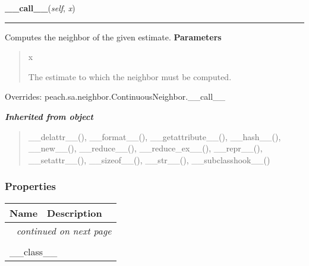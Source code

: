     \vspace{0.5ex}

\hspace{.8\funcindent}\begin{boxedminipage}{\funcwidth}

    \raggedright \textbf{\_\_call\_\_}(\textit{self}, \textit{x})

    \vspace{-1.5ex}

    \rule{\textwidth}{0.5\fboxrule}
\setlength{\parskip}{2ex}

Computes the neighbor of the given estimate.
\setlength{\parskip}{1ex}
      \textbf{Parameters}
      \vspace{-1ex}

      \begin{quote}
        \begin{Ventry}{x}

          \item[x]


The estimate to which the neighbor must be computed.
        \end{Ventry}

      \end{quote}

      Overrides: peach.sa.neighbor.ContinuousNeighbor.\_\_call\_\_

    \end{boxedminipage}


\large{\textbf{\textit{Inherited from object}}}

\begin{quote}
\_\_delattr\_\_(), \_\_format\_\_(), \_\_getattribute\_\_(), \_\_hash\_\_(), \_\_new\_\_(), \_\_reduce\_\_(), \_\_reduce\_ex\_\_(), \_\_repr\_\_(), \_\_setattr\_\_(), \_\_sizeof\_\_(), \_\_str\_\_(), \_\_subclasshook\_\_()
\end{quote}


  \subsubsection{Properties}

    \vspace{-1cm}
\hspace{\varindent}\begin{longtable}{|p{\varnamewidth}|p{\vardescrwidth}|l}
\cline{1-2}
\cline{1-2} \centering \textbf{Name} & \centering \textbf{Description}& \\
\cline{1-2}
\endhead\cline{1-2}\multicolumn{3}{r}{\small\textit{continued on next page}}\\\endfoot\cline{1-2}
\endlastfoot\multicolumn{2}{|l|}{\textit{Inherited from object}}\\
\multicolumn{2}{|p{\varwidth}|}{\raggedright \_\_class\_\_}\\
\cline{1-2}
\end{longtable}


